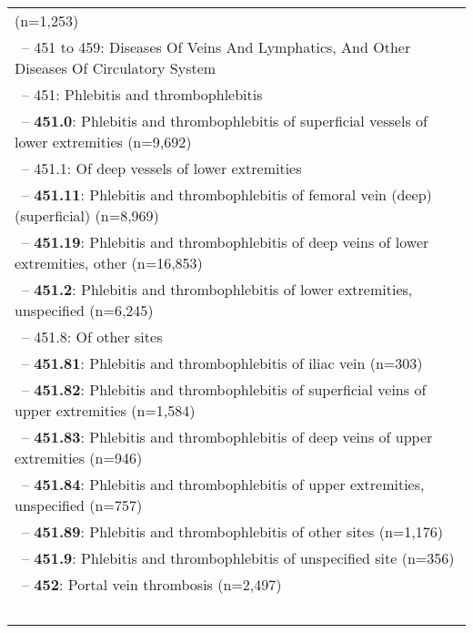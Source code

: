 \begin{longtable}{p{\textwidth}}
(n=1,253)} \\ \-\ \hspace{10pt}\footnotesize{-- 451 to 459: Diseases Of Veins And Lymphatics, And Other Diseases Of Circulatory System} \\ \-\ \hspace{20pt}\footnotesize{-- 451: Phlebitis and thrombophlebitis} \\ \-\ \hspace{30pt}\footnotesize{-- {\color{ForestGreen} \textbf{451.0}}: Phlebitis and thrombophlebitis of superficial vessels of lower extremities (n=9,692)} \\ \-\ \hspace{30pt}\footnotesize{-- 451.1: Of deep vessels of lower extremities} \\ \-\ \hspace{40pt}\footnotesize{-- {\color{ForestGreen} \textbf{451.11}}: Phlebitis and thrombophlebitis of femoral vein (deep) (superficial) (n=8,969)} \\ \-\ \hspace{40pt}\footnotesize{-- {\color{ForestGreen} \textbf{451.19}}: Phlebitis and thrombophlebitis of deep veins of lower extremities, other (n=16,853)} \\ \-\ \hspace{30pt}\footnotesize{-- {\color{ForestGreen} \textbf{451.2}}: Phlebitis and thrombophlebitis of lower extremities, unspecified (n=6,245)} \\ \-\ \hspace{30pt}\footnotesize{-- 451.8: Of other sites} \\ \-\ \hspace{40pt}\footnotesize{-- {\color{ForestGreen} \textbf{451.81}}: Phlebitis and thrombophlebitis of iliac vein (n=303)} \\ \-\ \hspace{40pt}\footnotesize{-- {\color{ForestGreen} \textbf{451.82}}: Phlebitis and thrombophlebitis of superficial veins of upper extremities (n=1,584)} \\ \-\ \hspace{40pt}\footnotesize{-- {\color{ForestGreen} \textbf{451.83}}: Phlebitis and thrombophlebitis of deep veins of upper extremities (n=946)} \\ \-\ \hspace{40pt}\footnotesize{-- {\color{ForestGreen} \textbf{451.84}}: Phlebitis and thrombophlebitis of upper extremities, unspecified (n=757)} \\ \-\ \hspace{40pt}\footnotesize{-- {\color{ForestGreen} \textbf{451.89}}: Phlebitis and thrombophlebitis of other sites (n=1,176)} \\ \-\ \hspace{30pt}\footnotesize{-- {\color{ForestGreen} \textbf{451.9}}: Phlebitis and thrombophlebitis of unspecified site (n=356)} \\ \-\ \hspace{20pt}\footnotesize{-- {\color{ForestGreen} \textbf{452}}: Portal vein thrombosis (n=2,497)} \\ \-\ \hspace{20pt}\footnotesize{-- 453: Other venous embolism and 
\end{longtable}
